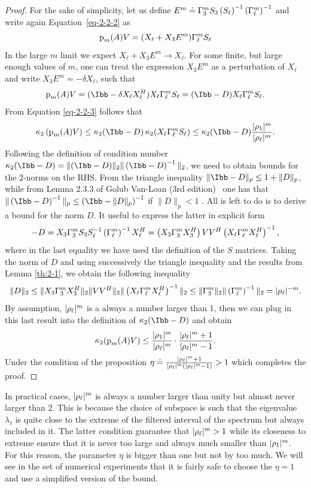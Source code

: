\begin{proof}
For the sake of simplicity, let us define $E^m \doteq \Gamma_3^m S_3 \left(S_\ell\right)^{-1} \left(\Gamma_\ell^m\right)^{-1}$ and write again Equation~\eqref{eq-2-2-2} as
\[
{\textrm p}_{m} (A) V = (X_\ell + X_3 E^m) \Gamma_\ell^m S_\ell
\]
In the large $m$ limit we expect $X_\ell + X_3 E^m \longrightarrow X_\ell$. For some finite, but large enough values of $m$, one can treat the expression $X_3E^m$ as a perturbation of $X_\ell$ and write $X_3 E^m = - \delta X_\ell$, such that 
\[
\pl (A) V = (\Ibb - \delta X_\ell X_\ell^H) X_\ell \Gamma_\ell^m S_\ell = (\Ibb - D) X_\ell \Gamma_\ell^m S_\ell.
\]
From Equation \eqref{eq-2-2-3} follows that 
\[
\cd \left(\pl (A)V\right) \leq \cd (\Ibb - D) \cd (X_\ell \Gamma_\ell^m S_\ell) \leq \cd (\Ibb - D) \frac{\rto 1{m}}{\rto \ell{m}}.
\]
Following the definition of condition number $\cd (\Ibb - D) = \|(\Ibb - D)\|_2 \|\left(\Ibb - D\right)^{-1}\|_2$, we need to obtain bounds for the 2-norms on the RHS. From the triangle inequality $\|\Ibb - D \|_p \leq 1 + \|D\|_p$, while from Lemma 2.3.3 of Golub Van-Loan (3rd edition)~\cite{Golub:2012wt} one has that $\|\left(\Ibb - D\right)^{-1}\|_p \leq \left( \Ibb - \|D\|_p\right)^{-1}$ if $\|D\|_p < 1$ . All is left to do is to derive a bound for the norm $D$. It useful to express the latter in explicit form
\[
- D = X_3 \Gamma_3^m S_3 S_\ell^{-1} \left(\Gamma_\ell^m\right)^{-1} X_\ell^H = \left(X_3 \Gamma_3^m X_3^H\right) V V^H \left(X_\ell \Gamma_\ell^m X_\ell^H\right)^{-1}, 
\]
where in the last equality we have used the definition of the $S$ matrices. Taking the norm of $D$ and using successively the triangle inequality and the results from Lemma \ref{th:2-1}, we obtain the following inequality
\[
\|D\|_2 \leq \|X_3 \Gamma_3^m X_3^H\|_2 \|V V^H\|_2 \|\left(X_\ell \Gamma_\ell^m X_\ell^H\right)^{-1}\|_2 \leq \|\Gamma_3^m\|_2 \|\left(\Gamma_\ell^m\right)^{-1}\|_2 = |\rho_{\ell}|^{-m}.
\]
By assumption, $|\rho_{\ell}|^{m}$ is a always a number larger than 1, then we can plug in this last result into the definition of $\cd (\Ibb - D)$ and obtain
\begin{equation}
    \mathop\mathrm{\kappa}_2\nolimits ({\textrm p}_{m} (A) V) \leq \frac{|\rho_{1}|^{m}}{|\rho_{\ell}|^{m}} \cdot \frac{|\rho_{\ell}|^{m} + 1}{|\rho_{\ell}|^{m} -1}.
\end{equation}
Under the condition of the proposition $\eta \doteq \frac{|\rho_{\ell}|^{m} + 1}{|\rho_{\ell}|^{m} (|\rho_{\ell}|^{m} -1)} > 1$ which completes the proof.
\end{proof}

\begin{remark}
\label{obs:2-1}
In practical cases, $|\rho_{\ell}|^{m}$ is always a number larger than unity but almost never larger than 2. This is because the choice of subspace is such that the eigenvalue $\lambda_\ell$ is quite close to the extreme of the filtered interval of the spectrum but always included in it. The latter condition guarantee that $|\rho_{\ell}|^{m} > 1$ while its closeness to extreme ensure that it is never too large and always much smaller than $|\rho_{1}|^{m}$. For this reason, the parameter $\eta$ is bigger than one but not by too much. We will see in the set of numerical experiments that it is fairly safe to choose the $\eta = 1$ and use a simplified version of the bound.
\end{remark}

